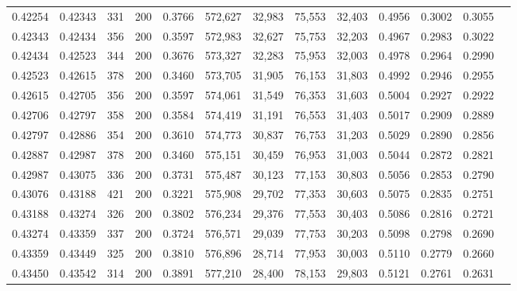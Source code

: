 \begin{tabular}{rrrrrrrrrrrrr}
0.42254 & 0.42343 &    331 & 200 &                                     0.3766 & 572,627 &  32,983 &  75,553 &  32,403 & 0.4956 & 0.3002 & 0.3055 \\
0.42343 & 0.42434 &    356 & 200 &                                     0.3597 & 572,983 &  32,627 &  75,753 &  32,203 & 0.4967 & 0.2983 & 0.3022 \\
0.42434 & 0.42523 &    344 & 200 &                                     0.3676 & 573,327 &  32,283 &  75,953 &  32,003 & 0.4978 & 0.2964 & 0.2990 \\
0.42523 & 0.42615 &    378 & 200 &                                     0.3460 & 573,705 &  31,905 &  76,153 &  31,803 & 0.4992 & 0.2946 & 0.2955 \\
0.42615 & 0.42705 &    356 & 200 &                                     0.3597 & 574,061 &  31,549 &  76,353 &  31,603 & 0.5004 & 0.2927 & 0.2922 \\
0.42706 & 0.42797 &    358 & 200 &                                     0.3584 & 574,419 &  31,191 &  76,553 &  31,403 & 0.5017 & 0.2909 & 0.2889 \\
0.42797 & 0.42886 &    354 & 200 &                                     0.3610 & 574,773 &  30,837 &  76,753 &  31,203 & 0.5029 & 0.2890 & 0.2856 \\
0.42887 & 0.42987 &    378 & 200 &                                     0.3460 & 575,151 &  30,459 &  76,953 &  31,003 & 0.5044 & 0.2872 & 0.2821 \\
0.42987 & 0.43075 &    336 & 200 &                                     0.3731 & 575,487 &  30,123 &  77,153 &  30,803 & 0.5056 & 0.2853 & 0.2790 \\
0.43076 & 0.43188 &    421 & 200 &                                     0.3221 & 575,908 &  29,702 &  77,353 &  30,603 & 0.5075 & 0.2835 & 0.2751 \\
0.43188 & 0.43274 &    326 & 200 &                                     0.3802 & 576,234 &  29,376 &  77,553 &  30,403 & 0.5086 & 0.2816 & 0.2721 \\
0.43274 & 0.43359 &    337 & 200 &                                     0.3724 & 576,571 &  29,039 &  77,753 &  30,203 & 0.5098 & 0.2798 & 0.2690 \\
0.43359 & 0.43449 &    325 & 200 &                                     0.3810 & 576,896 &  28,714 &  77,953 &  30,003 & 0.5110 & 0.2779 & 0.2660 \\
0.43450 & 0.43542 &    314 & 200 &                                     0.3891 & 577,210 &  28,400 &  78,153 &  29,803 & 0.5121 & 0.2761 & 0.2631 \\

\end{tabular}
